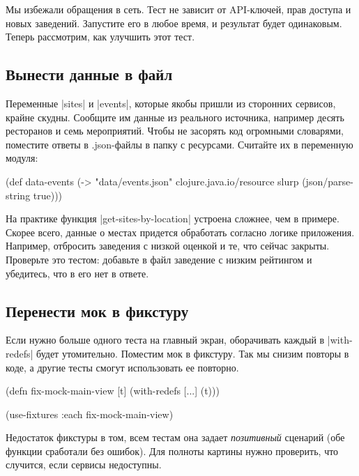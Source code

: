 Мы избежали обращения в сеть. Тест не зависит от API-ключей, прав доступа и
новых заведений. Запустите его в любое время, и результат будет
одинаковым. Теперь рассмотрим, как улучшить этот тест.

\subsection{Вынести данные в файл}

Переменные \spverb|sites| и \spverb|events|, которые якобы пришли из сторонних
сервисов, крайне скудны. Сообщите им данные из реального источника, например
десять ресторанов и семь мероприятий. Чтобы не засорять код огромными словарями,
поместите ответы в .json-файлы в папку с ресурсами. Считайте их в переменную
модуля:

\begin{english}
  \begin{clojure}
(def data-events
  (-> "data/events.json"
      clojure.java.io/resource
      slurp
      (json/parse-string true)))
  \end{clojure}
\end{english}

На практике функция \spverb|get-sites-by-location| устроена сложнее, чем в
примере. Скорее всего, данные о местах придется обработать согласно логике
приложения. Например, отбросить заведения с низкой оценкой и те, что сейчас
закрыты. Проверьте это тестом: добавьте в файл заведение с низким рейтингом и
убедитесь, что в его нет в ответе.

\subsection{Перенести мок в фикстуру}

Если нужно больше одного теста на главный экран, оборачивать каждый в
\spverb|with-redefs| будет утомительно. Поместим мок в фикстуру. Так мы снизим
повторы в коде, а другие тесты смогут использовать ее повторно.

\begin{english}
  \begin{clojure}
(defn fix-mock-main-view [t]
  (with-redefs [...]
    (t)))

(use-fixtures :each fix-mock-main-view)
  \end{clojure}
\end{english}

Недостаток фикстуры в том, всем тестам она задает \emph{позитивный} сценарий
(обе функции сработали без ошибок). Для полноты картины нужно проверить, что
случится, если сервисы недоступны.

